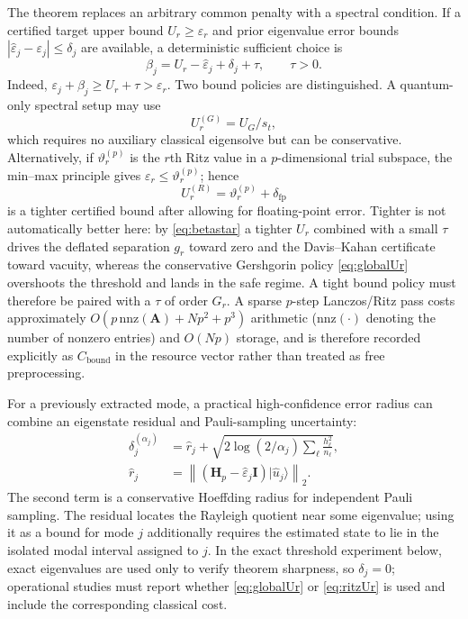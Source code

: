 \documentclass{ieeeaccess}
\newcommand{\A}{\mathbf{A}}
\newcommand{\Hq}{\mathbf{H}}
\newcommand{\I}{\mathbf{I}}
\newcommand{\norm}[1]{\left\lVert #1\right\rVert}
\begin{document}
The theorem replaces an arbitrary common penalty with a spectral condition. If a certified target upper bound $U_r\ge\varepsilon_r$ and prior eigenvalue error bounds $|\widehat\varepsilon_j-\varepsilon_j|\le\delta_j$ are available, a deterministic sufficient choice is
\begin{equation}
\boxed{
\beta_j=U_r-\widehat\varepsilon_j+\delta_j+\tau,
\qquad \tau>0.
}
\label{eq:certbeta}
\end{equation}
Indeed, $\varepsilon_j+\beta_j\ge U_r+\tau>\varepsilon_r$. Two bound policies are distinguished. A quantum-only spectral setup may use
\begin{equation}
U_r^{(G)}=U_G/s_t,
\label{eq:globalUr}
\end{equation}
which requires no auxiliary classical eigensolve but can be conservative. Alternatively, if $\vartheta_r^{(p)}$ is the $r$th Ritz value in a $p$-dimensional trial subspace, the min--max principle gives $\varepsilon_r\le\vartheta_r^{(p)}$; hence
\begin{equation}
U_r^{(R)}=\vartheta_r^{(p)}+\delta_{\mathrm{fp}}
\label{eq:ritzUr}
\end{equation}
is a tighter certified bound after allowing for floating-point error. Tighter is not automatically better here: by \cref{eq:betastar} a tighter $U_r$ combined with a small $\tau$ drives the deflated separation $g_r$ toward zero and the Davis--Kahan certificate toward vacuity, whereas the conservative Gershgorin policy \cref{eq:globalUr} overshoots the threshold and lands in the safe regime. A tight bound policy must therefore be paired with a $\tau$ of order $G_r$. A sparse $p$-step Lanczos/Ritz pass costs approximately $O(p\,\mathrm{nnz}(\A)+Np^2+p^3)$ arithmetic ($\mathrm{nnz}(\cdot)$ denoting the number of nonzero entries) and $O(Np)$ storage, and is therefore recorded explicitly as $C_{\mathrm{bound}}$ in the resource vector rather than treated as free preprocessing.

For a previously extracted mode, a practical high-confidence error radius can combine an eigenstate residual and Pauli-sampling uncertainty:
\begin{equation}
\begin{aligned}
\delta_j^{(\alpha_j)}&=\widehat r_j+
\sqrt{2\log(2/\alpha_j)\sum_{\ell}\frac{h_\ell^2}{n_\ell}},\\
\widehat r_j&=\norm{(\Hq_p-\widehat\varepsilon_j\I)|\widehat u_j\rangle}_2.
\end{aligned}
\label{eq:deltabound}
\end{equation}
The second term is a conservative Hoeffding radius for independent Pauli sampling. The residual locates the Rayleigh quotient near some eigenvalue; using it as a bound for mode $j$ additionally requires the estimated state to lie in the isolated modal interval assigned to $j$. In the exact threshold experiment below, exact eigenvalues are used only to verify theorem sharpness, so $\delta_j=0$; operational studies must report whether \cref{eq:globalUr} or \cref{eq:ritzUr} is used and include the corresponding classical cost.
\end{document}
